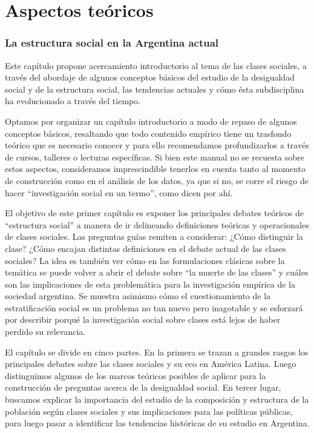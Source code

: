 \documentclass[
]{article}
\begin{document}
\hypertarget{part-aspectos-teuxf3ricos}{%
\part{Aspectos teóricos}\label{part-aspectos-teuxf3ricos}}

\hypertarget{estructura1}{%
\section{La estructura social en la Argentina actual}\label{estructura1}}

Este capítulo propone acercamiento introductorio al tema de las clases sociales, a través del abordaje de algunos conceptos básicos del estudio de la desigualdad social y de la estructura social, las tendencias actuales y cómo ésta subdisciplina ha evolucionado a través del tiempo.

Optamos por organizar un capítulo introductorio a modo de repaso de algunos conceptos básicos, resaltando que todo contenido empírico tiene un trasfondo teórico que es necesario conocer y para ello recomendamos profundizarlos a través de cursos, talleres o lecturas específicas. Si bien este manual no se recuesta sobre estos aspectos, consideramos imprescindible tenerlos en cuenta tanto al momento de construcción como en el análisis de los datos, ya que si no, se corre el riesgo de hacer ``investigación social en un termo'', como dicen por ahí.

El objetivo de este primer capítulo es exponer los principales debates teóricos de ``estructura social'' a manera de ir delineando definiciones teóricas y operacionales de clases sociales. Las preguntas guías remiten a considerar: ¿Cómo distinguir la clase? ¿Cómo encajan distintas definiciones en el debate actual de las clases sociales? La idea es también ver cómo en las formulaciones clásicas sobre la temática se puede volver a abrir el debate sobre ``la muerte de las clases'' y cuáles son las implicaciones de esta problemática para la investigación empírica de la sociedad argentina. Se muestra asimismo cómo el cuestionamiento de la estratificación social es un problema no tan nuevo pero inagotable y se esforzará por describir porqué la investigación social sobre clases está lejos de haber perdido su relevancia.

El capítulo se divide en cinco partes. En la primera se trazan a grandes rasgos los principales debates sobre las clases sociales y su eco en América Latina. Luego distinguimos algunos de los marcos teóricos posibles de aplicar para la construcción de preguntas acerca de la desigualdad social. En tercer lugar, buscamos explicar la importancia del estudio de la composición y estructura de la población según clases sociales y sus implicaciones para las políticas públicas, para luego pasar a identificar las tendencias históricas de su estudio en Argentina.
\end{document}
